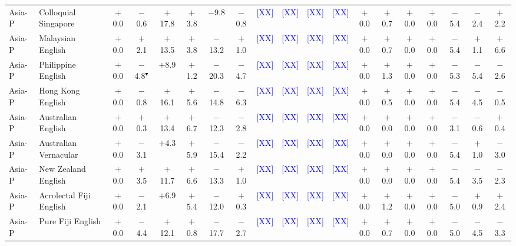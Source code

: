 \begin{table}[t]
\begin{tabular}{llccccccccccccccccc}
Asia-P & Colloquial Singapore & $+$0.0 & $-$0.6 & $+$17.8 & $+$3.8 & $-$9.8 & $-$0.8 & \textcolor{blue}{[XX]} & \textcolor{blue}{[XX]} & \textcolor{blue}{[XX]} & \textcolor{blue}{[XX]} & $+$0.0 & $+$0.7 & $+$0.0 & $+$0.0 & $-$5.4 & $-$2.4 & $+$2.2 \\
Asia-P & Malaysian English & $+$0.0 & $+$2.1 & $+$13.5 & $+$3.8 & $-$13.2 & $+$1.0 & \textcolor{blue}{[XX]} & \textcolor{blue}{[XX]} & \textcolor{blue}{[XX]} & \textcolor{blue}{[XX]} & $+$0.0 & $+$0.7 & $+$0.0 & $+$0.0 & $-$5.4 & $+$1.1 & $+$6.6 \\
Asia-P & Philippine English & $+$0.0 & $-$4.8$^\blacktriangledown$ & $+$8.9 & $+$1.2 & $-$20.3 & $-$4.7 & \textcolor{blue}{[XX]} & \textcolor{blue}{[XX]} & \textcolor{blue}{[XX]} & \textcolor{blue}{[XX]} & $+$0.0 & $+$1.3 & $+$0.0 & $+$0.0 & $-$5.3 & $-$5.4 & $-$2.6 \\
Asia-P & Hong Kong English & $+$0.0 & $-$0.8 & $+$16.1 & $+$5.6 & $-$14.8 & $-$6.3 & \textcolor{blue}{[XX]} & \textcolor{blue}{[XX]} & \textcolor{blue}{[XX]} & \textcolor{blue}{[XX]} & $+$0.0 & $+$0.5 & $+$0.0 & $+$0.0 & $-$5.4 & $-$4.5 & $-$0.5 \\
Asia-P & Australian English & $+$0.0 & $+$0.3 & $+$13.4 & $+$6.7 & $-$12.3 & $-$2.8 & \textcolor{blue}{[XX]} & \textcolor{blue}{[XX]} & \textcolor{blue}{[XX]} & \textcolor{blue}{[XX]} & $+$0.0 & $+$0.0 & $+$0.0 & $+$0.0 & $-$3.1 & $-$0.6 & $+$0.4 \\
Asia-P & Australian Vernacular & $+$0.0 & $-$3.1 & $+$4.3 & $+$5.9 & $-$15.4 & $-$2.2 & \textcolor{blue}{[XX]} & \textcolor{blue}{[XX]} & \textcolor{blue}{[XX]} & \textcolor{blue}{[XX]} & $+$0.0 & $+$0.0 & $+$0.0 & $+$0.0 & $-$5.4 & $+$1.0 & $-$3.0 \\
Asia-P & New Zealand English & $+$0.0 & $+$3.5 & $+$11.7 & $+$6.6 & $-$13.3 & $+$1.0 & \textcolor{blue}{[XX]} & \textcolor{blue}{[XX]} & \textcolor{blue}{[XX]} & \textcolor{blue}{[XX]} & $+$0.0 & $+$0.0 & $+$0.0 & $+$0.0 & $-$5.4 & $-$3.5 & $-$2.3 \\
Asia-P & Acrolectal Fiji English & $+$0.0 & $-$2.1 & $+$6.9 & $+$5.4 & $-$12.0 & $+$0.3 & \textcolor{blue}{[XX]} & \textcolor{blue}{[XX]} & \textcolor{blue}{[XX]} & \textcolor{blue}{[XX]} & $+$0.0 & $+$1.2 & $+$0.0 & $+$0.0 & $-$5.0 & $+$0.9 & $+$2.4 \\
Asia-P & Pure Fiji English & $+$0.0 & $-$4.4 & $+$12.1 & $+$0.8 & $-$17.7 & $-$2.7 & \textcolor{blue}{[XX]} & \textcolor{blue}{[XX]} & \textcolor{blue}{[XX]} & \textcolor{blue}{[XX]} & $+$0.0 & $+$0.7 & $+$0.0 & $+$0.0 & $-$5.0 & $-$4.5 & $-$3.3 \\

\end{tabular}
\end{table}
